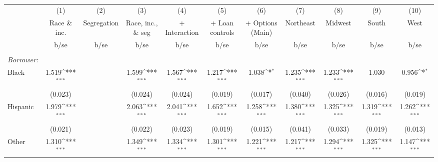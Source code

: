 {
\def\sym#1{\ifmmode^{#1}\else\(^{#1}\)\fi}
\begin{tabular}{l*{10}{c}}
\hline\hline
                    &\multicolumn{1}{c}{(1)}         &\multicolumn{1}{c}{(2)}         &\multicolumn{1}{c}{(3)}         &\multicolumn{1}{c}{(4)}         &\multicolumn{1}{c}{(5)}         &\multicolumn{1}{c}{(6)}         &\multicolumn{1}{c}{(7)}         &\multicolumn{1}{c}{(8)}         &\multicolumn{1}{c}{(9)}         &\multicolumn{1}{c}{(10)}         \\
                    &Race \& inc.         & Segregation         &Race, inc., \& seg         &+ Interaction         &+ Loan controls         &+ Options (Main)         &   Northeast         &     Midwest         &       South         &        West         \\
                    &        b/se         &        b/se         &        b/se         &        b/se         &        b/se         &        b/se         &        b/se         &        b/se         &        b/se         &        b/se         \\
\hline
& & & & & \\ 
 \emph{Borrower:} & & & & & \\ 
Black               &       1.519\sym{***}&                     &       1.599\sym{***}&       1.567\sym{***}&       1.217\sym{***}&       1.038\sym{*}  &       1.235\sym{***}&       1.233\sym{***}&       1.030         &       0.956\sym{*}  \\
                    &     (0.023)         &                     &     (0.024)         &     (0.024)         &     (0.019)         &     (0.017)         &     (0.040)         &     (0.026)         &     (0.016)         &     (0.019)         \\
Hispanic            &       1.979\sym{***}&                     &       2.063\sym{***}&       2.041\sym{***}&       1.652\sym{***}&       1.258\sym{***}&       1.380\sym{***}&       1.325\sym{***}&       1.319\sym{***}&       1.262\sym{***}\\
                    &     (0.021)         &                     &     (0.022)         &     (0.023)         &     (0.019)         &     (0.015)         &     (0.041)         &     (0.033)         &     (0.019)         &     (0.013)         \\
Other               &       1.310\sym{***}&                     &       1.349\sym{***}&       1.334\sym{***}&       1.301\sym{***}&       1.221\sym{***}&       1.217\sym{***}&       1.294\sym{***}&       1.325\sym{***}&       1.147\sym{***}\\

\end{tabular}}
